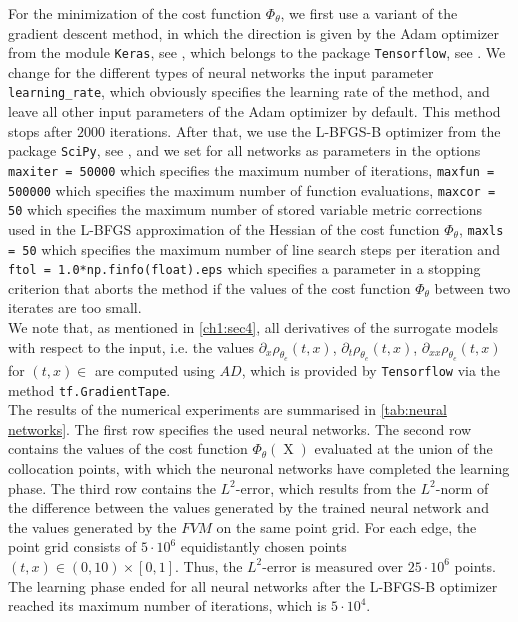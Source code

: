For the minimization of the cost function $\Phi_{\theta}$, we first use a variant of the gradient descent method, in which the direction is given by the Adam optimizer from the module \lstinline!Keras!, see \cite{Chollet:2015}, which belongs to the package \lstinline!Tensorflow!, see \cite{TensorFlow}. We change for the different types of neural networks the input parameter \lstinline!learning_rate!, which obviously specifies the learning rate of the method, and leave all other input parameters of the Adam optimizer by default. This method stops after $2000$ iterations. After that, we use the L-BFGS-B optimizer from the package \lstinline!SciPy!, see \cite{SciPy:2020}, and we set for all networks as parameters in the options \lstinline!maxiter = 50000! which specifies the maximum number of iterations, \lstinline!maxfun = 500000! which specifies the maximum number of function evaluations, \lstinline!maxcor = 50! which specifies the maximum number of stored variable metric corrections used in the L-BFGS approximation of the Hessian of the cost function $\Phi_{\theta}$, \lstinline!maxls = 50! which specifies the maximum number of line search steps per iteration and \lstinline!ftol = 1.0*np.finfo(float).eps! which specifies a parameter in a stopping criterion that aborts the method if the values of the cost function $\Phi_{\theta}$ between two iterates are too small. \\
We note that, as mentioned in \cref{ch1:sec4}, all derivatives of the surrogate models with respect to the input, i.e. the values $\partial_x \rho_{\theta_e}  \left( t, x \right)$, $\partial_t \rho_{\theta_e}  \left( t, x \right)$, $\partial_{xx} \rho_{\theta_e}  \left( t, x \right)$ for $(t, x) \in $ are computed using $AD$, which is provided by \lstinline!Tensorflow! via the method \lstinline!tf.GradientTape!. \\
The results of the numerical experiments are summarised in \cref{tab:neural networks}. The first row specifies the used neural networks. The second row contains the values of the cost function $\Phi_{\theta} \left( \operatorname{X} \right)$ evaluated at the union of the collocation points, with which the neuronal networks have completed the learning phase. The third row contains the $L^2$-error, which results from the $L^2$-norm of the difference between the values generated by the trained neural network and the values generated by the $FVM$ on the same point grid. For each edge, the point grid consists of $5 \cdot 10^{6}$ equidistantly chosen points $(t, x) \in \left(0, 10\right) \times \left[0,1\right]$. Thus, the $L^2$-error is measured over $25 \cdot 10^{6}$ points. The learning phase ended for all neural networks after the L-BFGS-B optimizer reached its maximum number of iterations, which is $5 \cdot 10^{4}$. \\

